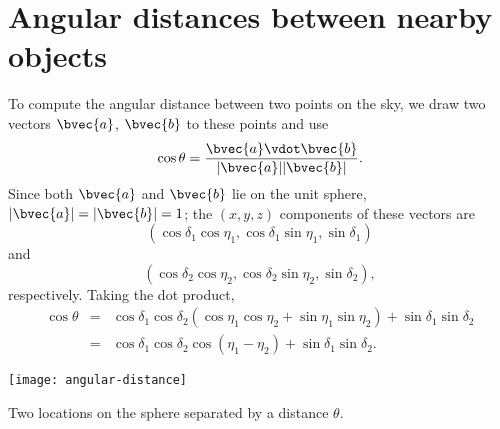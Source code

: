 \section{Angular distances between nearby objects}

To compute the angular distance between two points on the sky, we draw two vectors $\bvec{a}$, $\bvec{b}$ to these points and use
\[ \cos\theta = \frac{\bvec{a}\vdot\bvec{b}}{|\bvec{a}||\bvec{b}|}. \]
Since both $\bvec{a}$ and $\bvec{b}$ lie on the unit sphere, $|\bvec{a}| = |\bvec{b}| = 1$; the $(x,y,z)$ components of these vectors are
\[
\left(\cos\delta_{1}\cos\eta_{1}, \cos\delta_{1}\sin\eta_{1}, \sin\delta_{1}\right)
\]
and
\[
\left(\cos\delta_{2}\cos\eta_{2}, \cos\delta_{2}\sin\eta_{2}, \sin\delta_{2}\right),
\]
respectively. 
Taking the dot product,
\begin{eqnarray}
\cos\theta &=& \cos\delta_{1}\cos\delta_{2}\left(\cos\eta_{1}\cos\eta_{2} + 
	\sin\eta_{1}\sin\eta_{2}\right) + \sin\delta_{1}\sin\delta_{2}\nonumber\\
	 &=& \cos\delta_{1}\cos\delta_{2}\cos\left(\eta_{1}-\eta_{2}\right) + 
	 	\sin\delta_{1}\sin\delta_{2}.
\label{e.angular-distance}
\end{eqnarray}

\begin{marginfigure}[-14\baselineskip]
\texttt{[image: angular-distance]}
\caption[Angular distance between two points on a sphere]{Two locations on the sphere separated by a distance $\theta$.}
\label{f.angular-distance}
\end{marginfigure}

